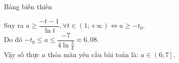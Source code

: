 \begin{ex}
{\begin{itemize}
			Bảng biến thiên
			\begin{center}
			\end{center}
			Suy ra $a\geqslant \dfrac{-t-1}{\ln t},\forall t\in \left(1;+\infty\right)\Leftrightarrow a\geqslant -t_0$.\\
			Do đó $-t_0\leqslant a\leqslant \dfrac{-7}{4\ln \tfrac{3}{4}}\approx 6{,}08$.\\
			Vậy số thực $a$ thỏa mãn yêu cầu bài toán là: $a\in \left(6;7\right]$.
		\end{itemize}
	}
\end{ex}
